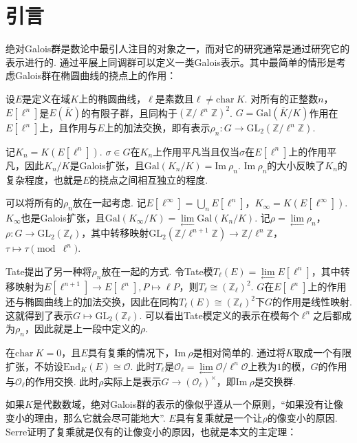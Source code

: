 \section{引言}

绝对Galois群是数论中最引人注目的对象之一，而对它的研究通常是通过研究它的表示进行的.
通过平展上同调群可以定义一类Galois表示。其中最简单的情形是考虑Galois群在椭圆曲线的挠点上的作用：

设$E$是定义在域$K$上的椭圆曲线，$\ell$是素数且$\ell\neq \mathrm{char}\ K$. 对所有的正整数$n$，$E[\ell^n]$是$E(\overline{K})$的有限子群，且同构于$(\mathbb{Z}/\ell^n\mathbb{Z})^2$. $G = \mathrm{Gal}(\overline{K}/K)$作用在$E[\ell^n]$上，且作用与$E$上的加法交换，即有表示$\rho_n:G\to \mathrm{GL}_2(\mathbb{Z}/\ell^n \mathbb{Z})$.

记$K_n=K(E[\ell^n])$. $\sigma\in G$在$K_n$上作用平凡当且仅当$\sigma$在$E[\ell^n]$上的作用平凡，因此$K_n/K$是Galois扩张，且$\mathrm{Gal}(K_n/K)=\mathrm{Im}\ \rho_n$. $\mathrm{Im}\ \rho_n$的大小反映了$K_n$的复杂程度，也就是$E$的挠点之间相互独立的程度.

可以将所有的$\rho_n$放在一起考虑. 记$E[\ell^{\infty}]=\bigcup_n E[\ell^n]$，$K_{\infty} = K(E[\ell^{\infty}])$. $K_{\infty}$也是Galois扩张，且$\mathrm{Gal}(K_{\infty}/K) = \lim\limits_{\longleftarrow} \mathrm{Gal}(K_n/K)$. 记$\rho = \lim\limits_{\longleftarrow} \rho_n$，$\rho: G\to \mathrm{GL}_2(\mathbb{Z}_{\ell})$，其中转移映射$\mathrm{GL}_2(\mathbb{Z}/\ell^{n+1} \mathbb{Z}) \to \mathbb{Z}/\ell^n \mathbb{Z}$，$\tau \mapsto \tau \pmod{\ell^n}$.

Tate提出了另一种将$\rho_n$放在一起的方式. 令Tate模$T_{\ell}(E) = \lim\limits_{\longleftarrow} E[\ell^n]$，其中转移映射为$E[\ell^{n+1}]\to E[\ell^n], P\mapsto \ell P$，则$T_{\ell}\cong (\mathbb{Z}_{\ell})^2$. $G$在$E[\ell^n]$上的作用还与椭圆曲线上的加法交换，因此在同构$T_{\ell}(E)\cong (\mathbb{Z}_{\ell})^2$下$G$的作用是线性映射. 这就得到了表示$G\mapsto \mathrm{GL}_2(\mathbb{Z}_{\ell})$. 可以看出Tate模定义的表示在模每个$\ell^n$之后都成为$\rho_n$，因此就是上一段中定义的$\rho$.

在$\mathrm{char}\ K = 0$，且$E$具有复乘的情况下，$\mathrm{Im}\ \rho$是相对简单的. 通过将$K$取成一个有限扩张，不妨设$\mathrm{End}_K(E) \cong \mathcal{O}$. 此时$T_{\ell}$是$\mathcal{O}_{\ell} = \lim\limits_{\longleftarrow}\mathcal{O}/\ell^n \mathcal{O}$上秩为$1$的模，$G$的作用与$\mathcal{O}_{\ell}$的作用交换. 此时$\rho$实际上是表示$G\to (\mathcal{O}_{\ell})^{\times}$，即$\mathrm{Im}\ \rho$是交换群.

如果$K$是代数数域，绝对Galois群的表示的像似乎遵从一个原则，“如果没有让像变小的理由，那么它就会尽可能地大”. $E$具有复乘就是一个让$\rho$的像变小的原因. Serre证明了复乘就是仅有的让像变小的原因，也就是本文的主定理：

